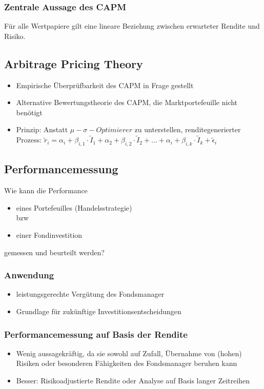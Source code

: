 \subsubsection{Zentrale Aussage des CAPM}
Für alle Wertpapiere gilt eine lineare Beziehung zwischen erwarteter Rendite und Risiko.


\subsection{Arbitrage Pricing Theory}
\begin{itemize}
	\item Empirische Überprüfbarkeit des CAPM in Frage gestellt
	\item Alternative Bewertungstheorie des CAPM, die Marktportefeuille nicht benötigt
	\item Prinzip: Anstatt \(\mu - \sigma - Optimierer\) zu unterstellen, renditegenerierter Prozess: \(\tilde{r}_i = \alpha_i + \beta_{i,1} \cdot \tilde{I}_1 + \alpha_2 + \beta_{i,2} \cdot \tilde{I}_2 + \dots + \alpha_i + \beta_{i,k} \cdot \tilde{I}_k + \tilde{\epsilon}_i\)
\end{itemize}


\subsection{Performancemessung}
Wie kann die Performance
\begin{itemize}
	\item eines Portefeuilles (Handelsstrategie)\\
	bzw
	\item einer Fondinvestition
\end{itemize}
gemessen und beurteilt werden?

\subsubsection{Anwendung}
\begin{itemize}
	\item leistungsgerechte Vergütung des Fondsmanager
	\item Grundlage für zukünftige Investitionsentscheidungen
\end{itemize}

\subsubsection{Performancemessung auf Basis der Rendite}
\begin{itemize}
	\item Wenig aussagekräftig, da sie sowohl auf Zufall, Übernahme von (hohen) Risiken oder besonderen Fähigkeiten des Fondsmanager beruhen kann
	\item Besser: Risikoadjustierte Rendite oder Analyse auf Basis langer Zeitreihen
\end{itemize}

